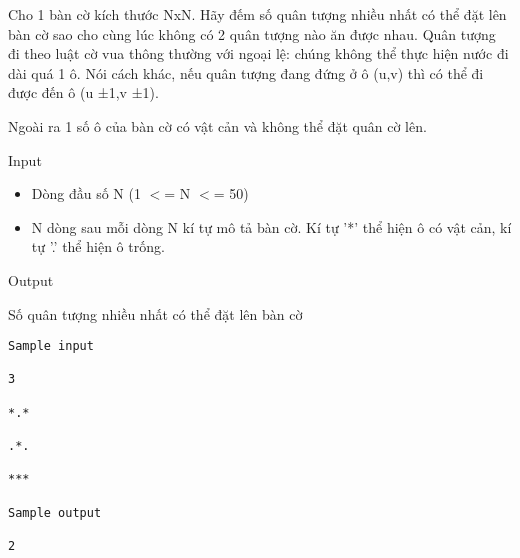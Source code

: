 

Cho 1 bàn cờ kích thước NxN. Hãy đếm số quân tượng nhiều nhất có thể đặt lên bàn cờ sao cho cùng lúc không có 2 quân tượng nào ăn được nhau. Quân tượng đi theo luật cờ vua thông thường với ngoại lệ: chúng không thể thực hiện nước đi dài quá 1 ô. Nói cách khác, nếu quân tượng đang đứng ở ô (u,v) thì có thể đi được đến ô (u ±1,v ±1).

Ngoài ra 1 số ô của bàn cờ có vật cản và không thể đặt quân cờ lên.

Input
\begin{itemize}
	\item Dòng đầu số N (1 $<$= N $<$= 50)
	\item N dòng sau mỗi dòng N kí tự mô tả bàn cờ. Kí tự '*' thể hiện ô có vật cản, kí tự '.' thể hiện ô trống.
\end{itemize}

Output

Số quân tượng nhiều nhất có thể đặt lên bàn cờ
\begin{verbatim}
Sample input

3

*.*

.*.

***

Sample output

2\end{verbatim}